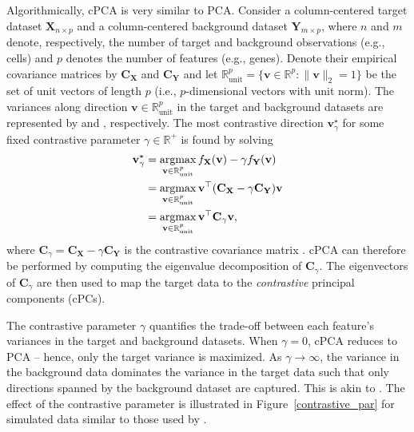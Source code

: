 Algorithmically, cPCA is very similar to PCA. Consider a column-centered target dataset $\mathbf{X}_{n \times p}$ and a column-centered background dataset $\mathbf{Y}_{m \times p}$, where $n$ and $m$ denote, respectively, the number of target and background observations (e.g., cells) and $p$ denotes the number of features (e.g., genes). Denote their empirical covariance matrices by $\mathbf{C_X}$ and $\mathbf{C_Y}$ and let $\mathbb{R}_{\text{unit}}^p=\{\mathbf{v} \in \mathbb{R}^p: \lVert\mathbf{v}\rVert_2 = 1\}$ be the set of unit vectors of length $p$ (i.e., $p$-dimensional vectors with unit norm). The variances along direction $\mathbf{v} \in \mathbb{R}_{\text{unit}}^p$ in the target and background datasets are represented by  and , respectively. The most contrastive direction $\mathbf{v}^{\star}_\gamma$ for some fixed contrastive parameter $\gamma \in \mathbb{R}^+$ is found by solving
\begin{equation}
    \begin{aligned}
  \mathbf{v}^{\star}_\gamma & = \operatorname*{argmax}_{\mathbf{v} \in \mathbb{R}_{\text{unit}}^p}
  {f_{\mathbf{X}}(\mathbf{v})-
    \gamma f_{\mathbf{Y}}(\mathbf{v})} \\
  & = \operatorname*{argmax}_{\mathbf{v} \in \mathbb{R}_{\text{unit}}^p}
    \mathbf{v}^\top(\mathbf{C_X} - \gamma\mathbf{C_Y})\mathbf{v} \\
  & = \operatorname*{argmax}_{\mathbf{v} \in \mathbb{R}_{\text{unit}}^p}
    \mathbf{v}^\top\mathbf{C}_{\gamma}\mathbf{v},
\end{aligned}
\end{equation}
where $\mathbf{C}_{\gamma} =  \mathbf{C_X} - \gamma\mathbf{C_Y}$ is the contrastive covariance matrix \citep{Abid2018}. cPCA can therefore be performed by computing the eigenvalue decomposition of $\mathbf{C}_{\gamma}$. The eigenvectors of $\mathbf{C}_{\gamma}$ are then used to map the target data to the \textit{contrastive} principal components (cPCs).

The contrastive parameter $\gamma$ quantifies the trade-off between each feature's variances in the target and background datasets. When $\gamma = 0$, cPCA reduces to PCA -- hence, only the target variance  is maximized.  As $\gamma \rightarrow \infty$, the variance in the background data dominates the variance in the target data such that only directions spanned by the background dataset are captured. This is akin to  \citep{Abid2018}. The effect of the contrastive parameter is illustrated in Figure~\ref{contrastive_par} for simulated data similar to those used by \citet{Abid2018}.


